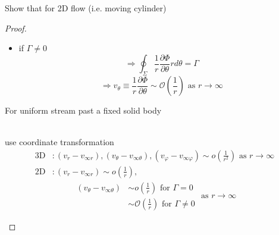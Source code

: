 \begin{exercise}{Show that for 2D flow (i.e. moving cylinder)}
\begin{proof}
\begin{itemize}
\[\]
\[
\Longrightarrow v_\theta \equiv \frac{1}{r}\frac{\partial\Phi}{\partial\theta}\sim o\left(\frac{1}{r}\right)\text{ as }r\to\infty
\]
\item if $\Gamma \neq 0$\\
\[
\Longrightarrow\oint_\Sigma\frac{1}{r}\frac{\partial\Phi}{\partial\theta}rd\theta = \Gamma
\]
\[
\Longrightarrow v_\theta \equiv \frac{1}{r}\frac{\partial\Phi}{\partial\theta}\sim \mathcal{O}\left(\frac{1}{r}\right)\text{ as }r\to\infty
\]
\end{itemize}
\begin{note}{For uniform stream past a fixed solid body}\mbox{}\\
\mbox{}\\
use coordinate transformation
\begin{align*}
\text{3D}&\colon \left(v_r-v_{\infty r}\right),\left(v_\theta-v_{\infty \theta}\right), \left(v_\varphi-v_{\infty \varphi}\right)\sim o\left(\frac{1}{r^2}\right)\text{ as }r\to\infty \\
\text{2D}&\colon \left(v_r-v_{\infty r}\right)\sim o\left(\frac{1}{r}\right), 
\end{align*}
\[
\begin{aligned}
\left(v_\theta-v_{\infty \theta}\right)
&\sim o\left(\frac{1}{r}\right) \text{ for }\Gamma=0\\
&\sim \mathcal{O}\left(\frac{1}{r}\right)\text{ for }\Gamma\neq 0
\end{aligned}
\text{ as }r\to\infty
\]
\end{note}
\end{proof}
\end{exercise}
